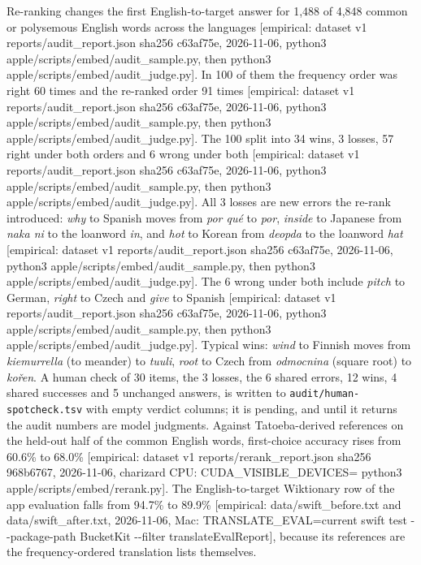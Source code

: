 \documentclass[11pt]{article}
\newcommand{\tg}[1]{\textcolor{bucketgray}{\footnotesize #1}}
\begin{document}
Re-ranking changes the first English-to-target answer for 1,488 of 4,848 common or polysemous English words across the languages \tg{[empirical: dataset v1 reports/audit\_report.json sha256 c63af75e, 2026-11-06, python3 apple/scripts/embed/audit\_sample.py, then python3 apple/scripts/embed/audit\_judge.py]}. In 100 of them the frequency order was right 60 times and the re-ranked order 91 times \tg{[empirical: dataset v1 reports/audit\_report.json sha256 c63af75e, 2026-11-06, python3 apple/scripts/embed/audit\_sample.py, then python3 apple/scripts/embed/audit\_judge.py]}. The 100 split into 34 wins, 3 losses, 57 right under both orders and 6 wrong under both \tg{[empirical: dataset v1 reports/audit\_report.json sha256 c63af75e, 2026-11-06, python3 apple/scripts/embed/audit\_sample.py, then python3 apple/scripts/embed/audit\_judge.py]}. All 3 losses are new errors the re-rank introduced: \emph{why} to Spanish moves from \emph{por qu\'e} to \emph{por}, \emph{inside} to Japanese from \emph{naka ni} to the loanword \emph{in}, and \emph{hot} to Korean from \emph{deopda} to the loanword \emph{hat} \tg{[empirical: dataset v1 reports/audit\_report.json sha256 c63af75e, 2026-11-06, python3 apple/scripts/embed/audit\_sample.py, then python3 apple/scripts/embed/audit\_judge.py]}. The 6 wrong under both include \emph{pitch} to German, \emph{right} to Czech and \emph{give} to Spanish \tg{[empirical: dataset v1 reports/audit\_report.json sha256 c63af75e, 2026-11-06, python3 apple/scripts/embed/audit\_sample.py, then python3 apple/scripts/embed/audit\_judge.py]}. Typical wins: \emph{wind} to Finnish moves from \emph{kiemurrella} (to meander) to \emph{tuuli}, \emph{root} to Czech from \emph{odmocnina} (square root) to \emph{ko\v{r}en}. A human check of 30 items, the 3 losses, the 6 shared errors, 12 wins, 4 shared successes and 5 unchanged answers, is written to \texttt{audit/human-spotcheck.tsv} with empty verdict columns; it is pending, and until it returns the audit numbers are model judgments. Against Tatoeba-derived references on the held-out half of the common English words, first-choice accuracy rises from 60.6\% to 68.0\% \tg{[empirical: dataset v1 reports/rerank\_report.json sha256 968b6767, 2026-11-06, charizard CPU: CUDA\_VISIBLE\_DEVICES= python3 apple/scripts/embed/rerank.py]}. The English-to-target Wiktionary row of the app evaluation falls from 94.7\% to 89.9\% \tg{[empirical: data/swift\_before.txt and data/swift\_after.txt, 2026-11-06, Mac: TRANSLATE\_EVAL=current swift test -{}-package-path BucketKit -{}-filter translateEvalReport]}, because its references are the frequency-ordered translation lists themselves.
\end{document}
